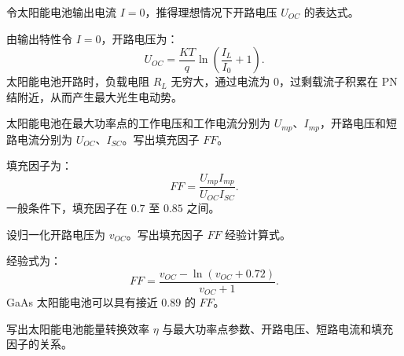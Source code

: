 \begin{problem}[开路电压]\label{exer:calc_04_solar_p123_01}
令太阳能电池输出电流 \(I = 0\)，推得理想情况下开路电压 \(U_{OC}\) 的表达式。
\end{problem}

\begin{solution}
由输出特性令 \(I = 0\)，开路电压为：
\begin{equation}
U_{OC}
= \frac{KT}{q}\ln\left(\frac{I_L}{I_0}+1\right).
\end{equation}
太阳能电池开路时，负载电阻 \(R_L\) 无穷大，通过电流为 \(0\)，过剩载流子积累在 PN 结附近，从而产生最大光生电动势。
\end{solution}

\begin{problem}[填充因子定义]\label{exer:calc_04_solar_p125_01}
太阳能电池在最大功率点的工作电压和工作电流分别为 \(U_{mp}\)、\(I_{mp}\)，开路电压和短路电流分别为 \(U_{OC}\)、\(I_{SC}\)。写出填充因子 \(FF\)。
\end{problem}

\begin{solution}
填充因子为：
\begin{equation}
FF = \frac{U_{mp}I_{mp}}{U_{OC}I_{SC}}.
\end{equation}
一般条件下，填充因子在 \(0.7\) 至 \(0.85\) 之间。
\end{solution}

\begin{problem}[填充因子经验式]\label{exer:calc_04_solar_p126_01}
设归一化开路电压为 \(v_{OC}\)。写出填充因子 \(FF\) 经验计算式。
\end{problem}

\begin{solution}
经验式为：
\begin{equation}
FF = \frac{v_{OC} - \ln(v_{OC}+0.72)}{v_{OC}+1}.
\end{equation}
GaAs 太阳能电池可以具有接近 \(0.89\) 的 \(FF\)。
\end{solution}

\begin{problem}[太阳能电池能量转换效率]\label{exer:calc_04_solar_p127_01}
写出太阳能电池能量转换效率 \(\eta\) 与最大功率点参数、开路电压、短路电流和填充因子的关系。
\end{problem}

